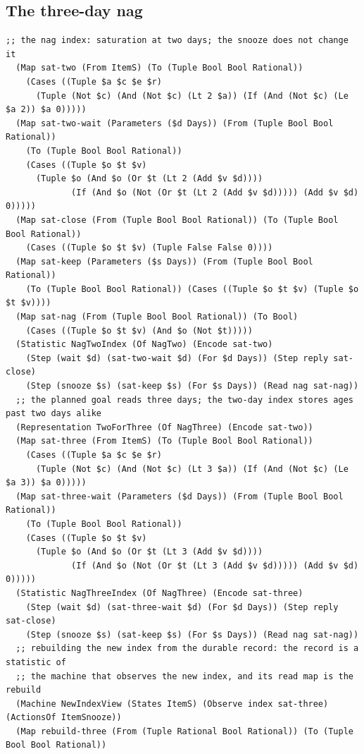 \documentclass[11pt]{article}
\theoremstyle{definition}
\theoremstyle{plain}
\begin{document}
\subsection{The three-day nag}\label{sec:nag3}

\begin{lstlisting}[style=mettamod]
  ;; the nag index: saturation at two days; the snooze does not change it
  (Map sat-two (From ItemS) (To (Tuple Bool Bool Rational))
    (Cases ((Tuple $a $c $e $r)
      (Tuple (Not $c) (And (Not $c) (Lt 2 $a)) (If (And (Not $c) (Le $a 2)) $a 0)))))
  (Map sat-two-wait (Parameters ($d Days)) (From (Tuple Bool Bool Rational))
    (To (Tuple Bool Bool Rational))
    (Cases ((Tuple $o $t $v)
      (Tuple $o (And $o (Or $t (Lt 2 (Add $v $d))))
             (If (And $o (Not (Or $t (Lt 2 (Add $v $d))))) (Add $v $d) 0)))))
  (Map sat-close (From (Tuple Bool Bool Rational)) (To (Tuple Bool Bool Rational))
    (Cases ((Tuple $o $t $v) (Tuple False False 0))))
  (Map sat-keep (Parameters ($s Days)) (From (Tuple Bool Bool Rational))
    (To (Tuple Bool Bool Rational)) (Cases ((Tuple $o $t $v) (Tuple $o $t $v))))
  (Map sat-nag (From (Tuple Bool Bool Rational)) (To Bool)
    (Cases ((Tuple $o $t $v) (And $o (Not $t)))))
  (Statistic NagTwoIndex (Of NagTwo) (Encode sat-two)
    (Step (wait $d) (sat-two-wait $d) (For $d Days)) (Step reply sat-close)
    (Step (snooze $s) (sat-keep $s) (For $s Days)) (Read nag sat-nag))
  ;; the planned goal reads three days; the two-day index stores ages past two days alike
  (Representation TwoForThree (Of NagThree) (Encode sat-two))
  (Map sat-three (From ItemS) (To (Tuple Bool Bool Rational))
    (Cases ((Tuple $a $c $e $r)
      (Tuple (Not $c) (And (Not $c) (Lt 3 $a)) (If (And (Not $c) (Le $a 3)) $a 0)))))
  (Map sat-three-wait (Parameters ($d Days)) (From (Tuple Bool Bool Rational))
    (To (Tuple Bool Bool Rational))
    (Cases ((Tuple $o $t $v)
      (Tuple $o (And $o (Or $t (Lt 3 (Add $v $d))))
             (If (And $o (Not (Or $t (Lt 3 (Add $v $d))))) (Add $v $d) 0)))))
  (Statistic NagThreeIndex (Of NagThree) (Encode sat-three)
    (Step (wait $d) (sat-three-wait $d) (For $d Days)) (Step reply sat-close)
    (Step (snooze $s) (sat-keep $s) (For $s Days)) (Read nag sat-nag))
  ;; rebuilding the new index from the durable record: the record is a statistic of
  ;; the machine that observes the new index, and its read map is the rebuild
  (Machine NewIndexView (States ItemS) (Observe index sat-three) (ActionsOf ItemSnooze))
  (Map rebuild-three (From (Tuple Rational Bool Rational)) (To (Tuple Bool Bool Rational))

\end{lstlisting}
\end{document}
